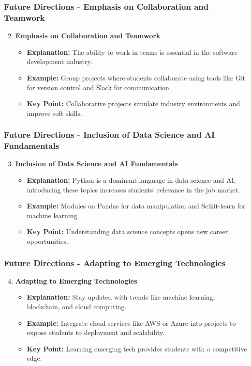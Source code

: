 \documentclass{beamer}
\begin{document}
\begin{frame}[fragile]
    \frametitle{Future Directions - Emphasis on Collaboration and Teamwork}
    \begin{enumerate}
        \setcounter{enumi}{1}
        \item \textbf{Emphasis on Collaboration and Teamwork}
        \begin{itemize}
            \item \textbf{Explanation:} The ability to work in teams is essential in the software development industry.
            \item \textbf{Example:} Group projects where students collaborate using tools like Git for version control and Slack for communication.
            \item \textbf{Key Point:} Collaborative projects simulate industry environments and improve soft skills.
        \end{itemize}
    \end{enumerate}
\end{frame}

\begin{frame}[fragile]
    \frametitle{Future Directions - Inclusion of Data Science and AI Fundamentals}
    \begin{enumerate}
        \setcounter{enumi}{2}
        \item \textbf{Inclusion of Data Science and AI Fundamentals}
        \begin{itemize}
            \item \textbf{Explanation:} Python is a dominant language in data science and AI, introducing these topics increases students' relevance in the job market.
            \item \textbf{Example:} Modules on Pandas for data manipulation and Scikit-learn for machine learning.
            \item \textbf{Key Point:} Understanding data science concepts opens new career opportunities.
        \end{itemize}
    \end{enumerate}
\end{frame}

\begin{frame}[fragile]
    \frametitle{Future Directions - Adapting to Emerging Technologies}
    \begin{enumerate}
        \setcounter{enumi}{3}
        \item \textbf{Adapting to Emerging Technologies}
        \begin{itemize}
            \item \textbf{Explanation:} Stay updated with trends like machine learning, blockchain, and cloud computing.
            \item \textbf{Example:} Integrate cloud services like AWS or Azure into projects to expose students to deployment and scalability.
            \item \textbf{Key Point:} Learning emerging tech provides students with a competitive edge.
        \end{itemize}
    \end{enumerate}
\end{frame}
\end{document}
